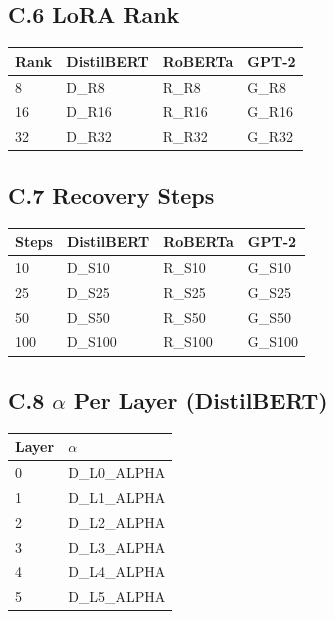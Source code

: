 \subsection{C.6 LoRA Rank}

\begin{table}[H]
\centering
\small
\begin{tabular}{llll}
\toprule
\textbf{Rank} & \textbf{DistilBERT} & \textbf{RoBERTa} & \textbf{GPT-2} \\
\midrule
8 & {{D\_R8}} & {{R\_R8}} & {{G\_R8}} \\
16 & {{D\_R16}} & {{R\_R16}} & {{G\_R16}} \\
32 & {{D\_R32}} & {{R\_R32}} & {{G\_R32}} \\
\bottomrule
\end{tabular}
\end{table}

\subsection{C.7 Recovery Steps}

\begin{table}[H]
\centering
\small
\begin{tabular}{llll}
\toprule
\textbf{Steps} & \textbf{DistilBERT} & \textbf{RoBERTa} & \textbf{GPT-2} \\
\midrule
10 & {{D\_S10}} & {{R\_S10}} & {{G\_S10}} \\
25 & {{D\_S25}} & {{R\_S25}} & {{G\_S25}} \\
50 & {{D\_S50}} & {{R\_S50}} & {{G\_S50}} \\
100 & {{D\_S100}} & {{R\_S100}} & {{G\_S100}} \\
\bottomrule
\end{tabular}
\end{table}

\subsection{C.8 $\alpha$ Per Layer (DistilBERT)}

\begin{table}[H]
\centering
\small
\begin{tabular}{ll}
\toprule
\textbf{Layer} & \textbf{$\alpha$} \\
\midrule
0 & {{D\_L0\_ALPHA}} \\
1 & {{D\_L1\_ALPHA}} \\
2 & {{D\_L2\_ALPHA}} \\
3 & {{D\_L3\_ALPHA}} \\
4 & {{D\_L4\_ALPHA}} \\
5 & {{D\_L5\_ALPHA}} \\
\bottomrule
\end{tabular}
\end{table}

